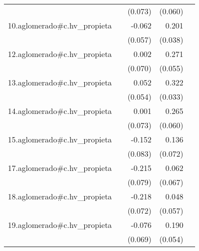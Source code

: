 {\begin{longtable}{l*{4}{D{.}{.}{-1}}}
            &                     &     (0.073)         &     (0.060)         &                     \\
\addlinespace
10.aglomerado#c.hv\_propieta&                     &      -0.062         &       0.201\sym{***}&                     \\
            &                     &     (0.057)         &     (0.038)         &                     \\
\addlinespace
12.aglomerado#c.hv\_propieta&                     &       0.002         &       0.271\sym{***}&                     \\
            &                     &     (0.070)         &     (0.055)         &                     \\
\addlinespace
13.aglomerado#c.hv\_propieta&                     &       0.052         &       0.322\sym{***}&                     \\
            &                     &     (0.054)         &     (0.033)         &                     \\
\addlinespace
14.aglomerado#c.hv\_propieta&                     &       0.001         &       0.265\sym{***}&                     \\
            &                     &     (0.073)         &     (0.060)         &                     \\
\addlinespace
15.aglomerado#c.hv\_propieta&                     &      -0.152         &       0.136         &                     \\
            &                     &     (0.083)         &     (0.072)         &                     \\
\addlinespace
17.aglomerado#c.hv\_propieta&                     &      -0.215\sym{**} &       0.062         &                     \\
            &                     &     (0.079)         &     (0.067)         &                     \\
\addlinespace
18.aglomerado#c.hv\_propieta&                     &      -0.218\sym{**} &       0.048         &                     \\
            &                     &     (0.072)         &     (0.057)         &                     \\
\addlinespace
19.aglomerado#c.hv\_propieta&                     &      -0.076         &       0.190\sym{***}&                     \\
            &                     &     (0.069)         &     (0.054)         &                     \\

\end{longtable}}

